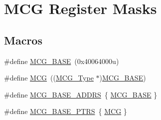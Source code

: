 \hypertarget{group___m_c_g___register___masks}{}\section{M\+CG Register Masks}
\label{group___m_c_g___register___masks}
\subsection*{Macros}
\begin{DoxyCompactItemize}
\item 
\#define \mbox{\hyperlink{group___m_c_g___register___masks_gaad20a4618a24bbbb2edab9643eb6db29}{M\+C\+G\+\_\+\+B\+A\+SE}}~(0x40064000u)
\item 
\#define \mbox{\hyperlink{group___m_c_g___register___masks_gad7ea2d93cafdbe9298ef1dd52be44f88}{M\+CG}}~((\mbox{\hyperlink{struct_m_c_g___type}{M\+C\+G\+\_\+\+Type}} $\ast$)\mbox{\hyperlink{group___m_c_g___register___masks_gaad20a4618a24bbbb2edab9643eb6db29}{M\+C\+G\+\_\+\+B\+A\+SE}})
\item 
\#define \mbox{\hyperlink{group___m_c_g___register___masks_gab7ba0907fd63f1e70dddac601e4f9dd9}{M\+C\+G\+\_\+\+B\+A\+S\+E\+\_\+\+A\+D\+D\+RS}}~\{ \mbox{\hyperlink{group___m_c_g___register___masks_gaad20a4618a24bbbb2edab9643eb6db29}{M\+C\+G\+\_\+\+B\+A\+SE}} \}
\item 
\#define \mbox{\hyperlink{group___m_c_g___register___masks_ga3e6aec328b7327acc1f7bff70bec388c}{M\+C\+G\+\_\+\+B\+A\+S\+E\+\_\+\+P\+T\+RS}}~\{ \mbox{\hyperlink{group___m_c_g___register___masks_gad7ea2d93cafdbe9298ef1dd52be44f88}{M\+CG}} \}
\end{DoxyCompactItemize}
